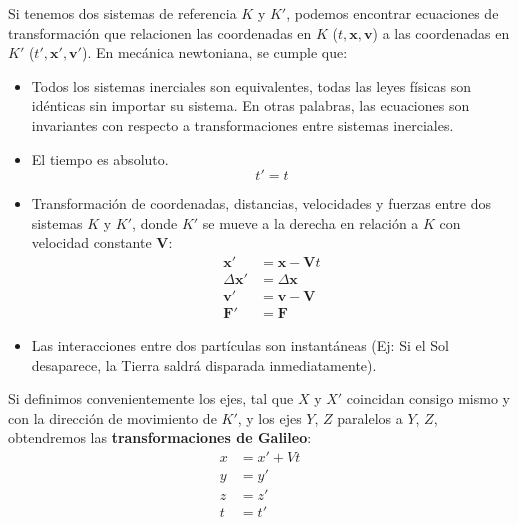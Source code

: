 \documentclass[]{article}
\numberwithin{equation}{section}
\begin{document}


Si tenemos dos sistemas de referencia $K$ y $K'$, podemos encontrar ecuaciones de transformación que relacionen las coordenadas en $K$ ($t, \mathbf{x}, \mathbf{v}$) a las coordenadas en $K'$ ($t', \mathbf{x}', \mathbf{v}'$). En mecánica newtoniana, se cumple que:
\begin{itemize}
	\item Todos los sistemas inerciales son equivalentes, todas las leyes físicas son idénticas sin importar su sistema. En otras palabras, las ecuaciones son invariantes con respecto a transformaciones entre sistemas inerciales.
	\item El tiempo es absoluto.
	\begin{equation}
		t' = t
	\end{equation}
	\item Transformación de coordenadas, distancias, velocidades y fuerzas entre dos sistemas  $K$ y $K'$, donde $K'$ se mueve a la derecha en relación a $K$ con velocidad constante $\mathbf{V}$:
	\begin{align*}
		\mathbf{x}' &= \mathbf{x} - \mathbf{V}t \\
		\Delta\mathbf{x}' &= \Delta\mathbf{x} \\
		\mathbf{v}' &= \mathbf{v} - \mathbf{V} \\
		\mathbf{F}' &= \mathbf{F} 
	\end{align*}
	\item Las interacciones entre dos partículas son instantáneas (Ej: Si el Sol desaparece, la Tierra saldrá disparada inmediatamente). 
\end{itemize}

Si definimos convenientemente los ejes, tal que $X$ y $X'$ coincidan consigo mismo y con la dirección de movimiento de $K'$, y los ejes $Y$, $Z$ paralelos a $Y$, $Z$, obtendremos las \textbf{transformaciones de Galileo}:
\begin{align}
	x&=x'+Vt\\
	y&=y'\\
	z&=z'\\
	t&=t'
\end{align}
\end{document}
